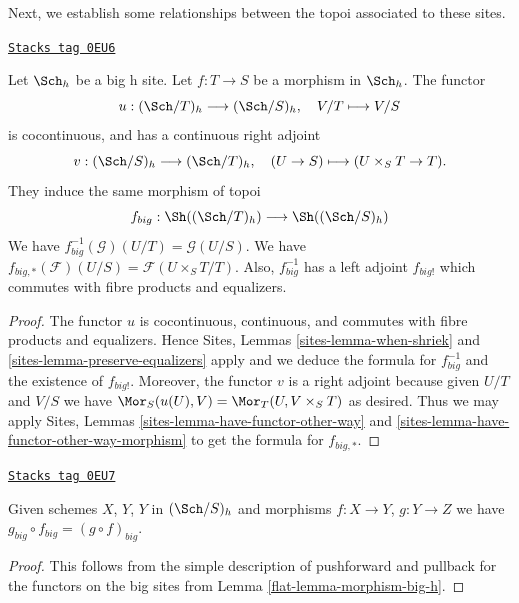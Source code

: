 Next, we establish some relationships between the topoi
associated to these sites.

\begin{lemma}
\label{flat-lemma-morphism-big-h}
\href{https://stacks.math.columbia.edu/tag/0EU6}{\texttt{Stacks tag 0EU6}}

Let $\Sch_h$ be a big h site.
Let $f : T \to S$ be a morphism in $\Sch_h$.
The functor
$$
u : (\Sch/T)_h \longrightarrow (\Sch/S)_h,
\quad
V/T \longmapsto V/S
$$
is cocontinuous, and has a continuous right adjoint
$$
v : (\Sch/S)_h \longrightarrow (\Sch/T)_h,
\quad
(U \to S) \longmapsto (U \times_S T \to T).
$$
They induce the same morphism of topoi
$$
f_{big} :
\Sh((\Sch/T)_h)
\longrightarrow
\Sh((\Sch/S)_h)
$$
We have $f_{big}^{-1}(\mathcal{G})(U/T) = \mathcal{G}(U/S)$.
We have $f_{big, *}(\mathcal{F})(U/S) = \mathcal{F}(U \times_S T/T)$.
Also, $f_{big}^{-1}$ has a left adjoint $f_{big!}$ which commutes with
fibre products and equalizers.
\end{lemma}

\begin{proof}
The functor $u$ is cocontinuous, continuous, and commutes with fibre products
and equalizers. Hence
Sites, Lemmas \ref{sites-lemma-when-shriek} and
\ref{sites-lemma-preserve-equalizers}
apply and we deduce the formula
for $f_{big}^{-1}$ and the existence of $f_{big!}$. Moreover,
the functor $v$ is a right adjoint because given $U/T$ and $V/S$
we have $\Mor_S(u(U), V) = \Mor_T(U, V \times_S T)$
as desired. Thus we may apply
Sites, Lemmas \ref{sites-lemma-have-functor-other-way} and
\ref{sites-lemma-have-functor-other-way-morphism} to get the
formula for $f_{big, *}$.
\end{proof}

\begin{lemma}[Composition h]
\label{flat-lemma-composition-h}
\href{https://stacks.math.columbia.edu/tag/0EU7}{\texttt{Stacks tag 0EU7}}

Given schemes $X$, $Y$, $Y$ in $(\Sch/S)_h$
and morphisms $f : X \to Y$, $g : Y \to Z$ we have
$g_{big} \circ f_{big} = (g \circ f)_{big}$.
\end{lemma}

\begin{proof}

This follows from the simple description of pushforward
and pullback for the functors on the big sites from
Lemma \ref{flat-lemma-morphism-big-h}.
\end{proof}

